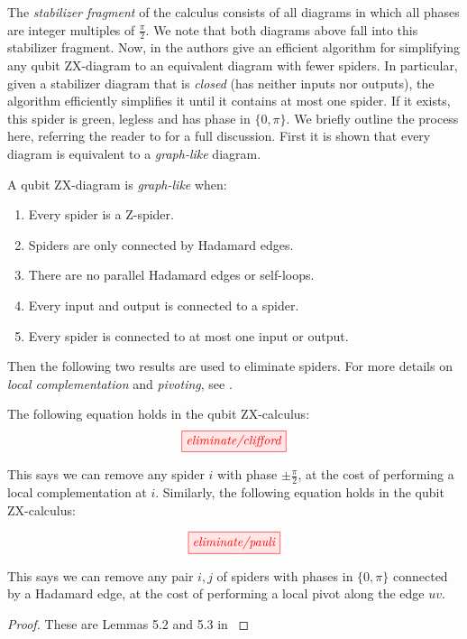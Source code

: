 The \textit{stabilizer fragment} of the calculus consists of all diagrams in which all phases are integer multiples of $\frac{\pi}{2}$. We note that both diagrams above fall into this stabilizer fragment. Now, in \cite[][Theorem 5.4]{graph_theoretic_simplification} the authors give an efficient algorithm for simplifying any qubit ZX-diagram to an equivalent diagram with fewer spiders. In particular, given a stabilizer diagram that is \textit{closed} (has neither inputs nor outputs), the algorithm efficiently simplifies it until it contains at most one spider. If it exists, this spider is green, legless and has phase in $\{0, \pi\}$. We briefly outline the process here, referring the reader to \citep{graph_theoretic_simplification} for a full discussion. First it is shown that every diagram is equivalent to a \textit{graph-like} diagram.

\begin{definition}
	\cite[][Definition 3.1]{graph_theoretic_simplification} A qubit ZX-diagram is \textit{graph-like} when:
	\begin{enumerate}
		\item Every spider is a Z-spider.
		\item Spiders are only connected by Hadamard edges.
		\item There are no parallel Hadamard edges or self-loops.
		\item Every input and output is connected to a spider.
		\item Every spider is connected to at most one input or output.
	\end{enumerate}
\end{definition}

Then the following two results are used to eliminate spiders. For more details on \textit{local complementation} and \textit{pivoting}, see \cite[][Section 4]{graph_theoretic_simplification}. 

\begin{theorem}\label{thm:qubit_eliminate_spiders}
	The following equation holds in the qubit ZX-calculus:
	\begin{equation}\label{eq:eliminate_clifford}
		\tikzfig{eliminate/clifford}
	\end{equation}

	This says we can remove any spider $i$ with phase $\pm\frac{\pi}{2}$, at the cost of performing a local complementation at $i$. Similarly, the following equation holds in the qubit ZX-calculus:

	\begin{equation}\label{eq:eliminate_pauli}
		\tikzfig{eliminate/pauli}
	\end{equation}

	This says we can remove any pair $i, j$ of spiders with phases in $\{0, \pi\}$ connected by a Hadamard edge, at the cost of performing a local pivot along the edge $uv$. 

	\begin{proof}
		These are Lemmas 5.2 and 5.3 in \citep{graph_theoretic_simplification}
	\end{proof}
\end{theorem}

